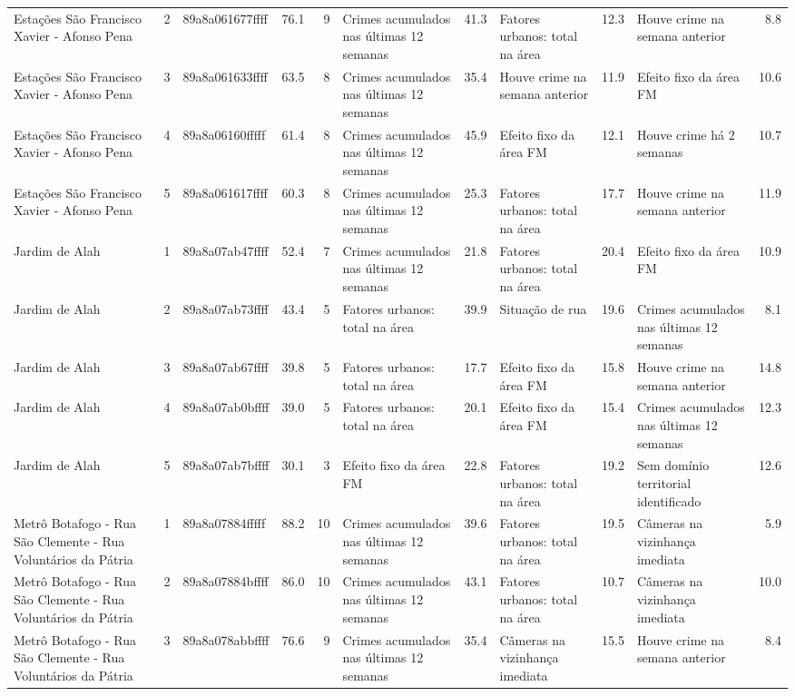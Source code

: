 \begin{tabular}{lrlrrlrlrlr}
Estações São Francisco Xavier - Afonso Pena & 2 & 89a8a061677ffff & 76.1 & 9 & Crimes acumulados nas últimas 12 semanas & 41.3 & Fatores urbanos: total na área & 12.3 & Houve crime na semana anterior & 8.8 \\
Estações São Francisco Xavier - Afonso Pena & 3 & 89a8a061633ffff & 63.5 & 8 & Crimes acumulados nas últimas 12 semanas & 35.4 & Houve crime na semana anterior & 11.9 & Efeito fixo da área FM & 10.6 \\
Estações São Francisco Xavier - Afonso Pena & 4 & 89a8a06160fffff & 61.4 & 8 & Crimes acumulados nas últimas 12 semanas & 45.9 & Efeito fixo da área FM & 12.1 & Houve crime há 2 semanas & 10.7 \\
Estações São Francisco Xavier - Afonso Pena & 5 & 89a8a061617ffff & 60.3 & 8 & Crimes acumulados nas últimas 12 semanas & 25.3 & Fatores urbanos: total na área & 17.7 & Houve crime na semana anterior & 11.9 \\
Jardim de Alah & 1 & 89a8a07ab47ffff & 52.4 & 7 & Crimes acumulados nas últimas 12 semanas & 21.8 & Fatores urbanos: total na área & 20.4 & Efeito fixo da área FM & 10.9 \\
Jardim de Alah & 2 & 89a8a07ab73ffff & 43.4 & 5 & Fatores urbanos: total na área & 39.9 & Situação de rua & 19.6 & Crimes acumulados nas últimas 12 semanas & 8.1 \\
Jardim de Alah & 3 & 89a8a07ab67ffff & 39.8 & 5 & Fatores urbanos: total na área & 17.7 & Efeito fixo da área FM & 15.8 & Houve crime na semana anterior & 14.8 \\
Jardim de Alah & 4 & 89a8a07ab0bffff & 39.0 & 5 & Fatores urbanos: total na área & 20.1 & Efeito fixo da área FM & 15.4 & Crimes acumulados nas últimas 12 semanas & 12.3 \\
Jardim de Alah & 5 & 89a8a07ab7bffff & 30.1 & 3 & Efeito fixo da área FM & 22.8 & Fatores urbanos: total na área & 19.2 & Sem domínio territorial identificado & 12.6 \\
Metrô Botafogo - Rua São Clemente - Rua Voluntários da Pátria & 1 & 89a8a07884fffff & 88.2 & 10 & Crimes acumulados nas últimas 12 semanas & 39.6 & Fatores urbanos: total na área & 19.5 & Câmeras na vizinhança imediata & 5.9 \\
Metrô Botafogo - Rua São Clemente - Rua Voluntários da Pátria & 2 & 89a8a07884bffff & 86.0 & 10 & Crimes acumulados nas últimas 12 semanas & 43.1 & Fatores urbanos: total na área & 10.7 & Câmeras na vizinhança imediata & 10.0 \\
Metrô Botafogo - Rua São Clemente - Rua Voluntários da Pátria & 3 & 89a8a078abbffff & 76.6 & 9 & Crimes acumulados nas últimas 12 semanas & 35.4 & Câmeras na vizinhança imediata & 15.5 & Houve crime na semana anterior & 8.4 \\

\end{tabular}
